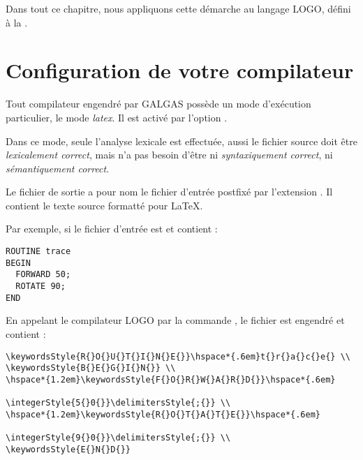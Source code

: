 Dans tout ce chapitre, nous appliquons cette démarche au langage LOGO, défini à la .





\section{Configuration de votre compilateur}

Tout compilateur engendré par GALGAS possède un mode d'exécution particulier, le mode \emph{latex}. Il est activé par l'option .

Dans ce mode, seule l'analyse lexicale est effectuée, aussi le fichier source doit être \emph{lexicalement correct}, mais n'a pas besoin d'être ni \emph{syntaxiquement correct}, ni \emph{sémantiquement correct}.

Le fichier de sortie a pour nom le fichier d'entrée postfixé par l'extension . Il contient le texte source formatté pour \LaTeX.

Par exemple, si le fichier d'entrée est  et contient :

\begin{lstlisting}
ROUTINE trace
BEGIN
  FORWARD 50;
  ROTATE 90;
END
\end{lstlisting}

En appelant le compilateur LOGO par la commande , le fichier  est engendré et contient :

\begin{verbatim}
\keywordsStyle{R{}O{}U{}T{}I{}N{}E{}}\hspace*{.6em}t{}r{}a{}c{}e{} \\
\keywordsStyle{B{}E{}G{}I{}N{}} \\
\hspace*{1.2em}\keywordsStyle{F{}O{}R{}W{}A{}R{}D{}}\hspace*{.6em}
                                       \integerStyle{5{}0{}}\delimitersStyle{;{}} \\
\hspace*{1.2em}\keywordsStyle{R{}O{}T{}A{}T{}E{}}\hspace*{.6em}
                                       \integerStyle{9{}0{}}\delimitersStyle{;{}} \\
\keywordsStyle{E{}N{}D{}}
\end{verbatim}

